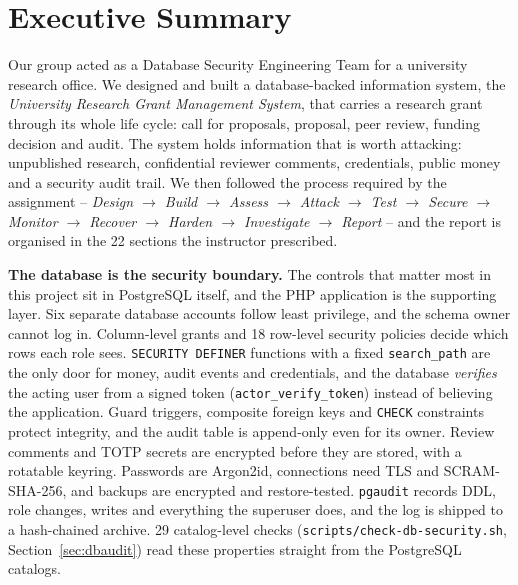 \documentclass[10pt,a4paper]{article}
\newcommand{\code}[1]{\nolinkurl{#1}}
\begin{document}
\begingroup\hypersetup{linkcolor=ink}
\renewcommand{\contentsname}{Contents}
\tableofcontents
\endgroup
\clearpage
\section{Executive Summary}\label{sec:exec}

Our group acted as a Database Security Engineering Team for a university research office. We designed and built a database-backed information system, the \emph{University Research Grant Management System}, that carries a research grant through its whole life cycle: call for proposals, proposal, peer review, funding decision and audit. The system holds information that is worth attacking: unpublished research, confidential reviewer comments, credentials, public money and a security audit trail. We then followed the process required by the assignment -- \emph{Design $\rightarrow$ Build $\rightarrow$ Assess $\rightarrow$ Attack $\rightarrow$ Test $\rightarrow$ Secure $\rightarrow$ Monitor $\rightarrow$ Recover $\rightarrow$ Harden $\rightarrow$ Investigate $\rightarrow$ Report} -- and the report is organised in the 22 sections the instructor prescribed.

\textbf{The database is the security boundary.} The controls that matter most in this project sit in PostgreSQL itself, and the PHP application is the supporting layer. Six separate database accounts follow least privilege, and the schema owner cannot log in. Column-level grants and 18 row-level security policies decide which rows each role sees. \code{SECURITY DEFINER} functions with a fixed \code{search\_path} are the only door for money, audit events and credentials, and the database \emph{verifies} the acting user from a signed token (\code{actor\_verify\_token}) instead of believing the application. Guard triggers, composite foreign keys and \code{CHECK} constraints protect integrity, and the audit table is append-only even for its owner. Review comments and TOTP secrets are encrypted before they are stored, with a rotatable keyring. Passwords are Argon2id, connections need TLS and SCRAM-SHA-256, and backups are encrypted and restore-tested. \code{pgaudit} records DDL, role changes, writes and everything the superuser does, and the log is shipped to a hash-chained archive. 29 catalog-level checks (\code{scripts/check-db-security.sh}, Section~\ref{sec:dbaudit}) read these properties straight from the PostgreSQL catalogs.
\end{document}
